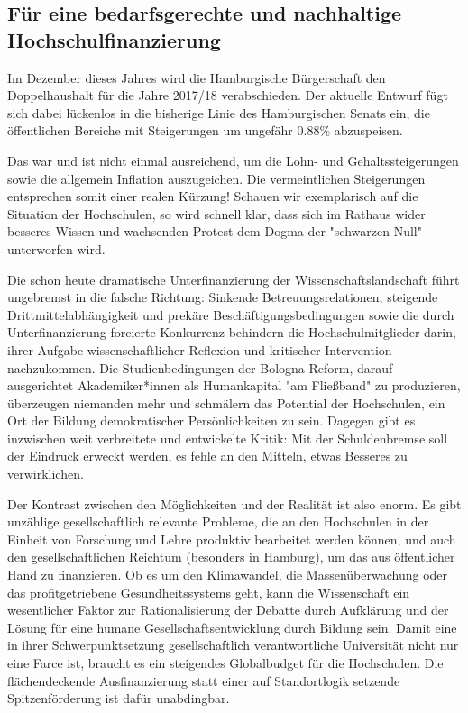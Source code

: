\documentclass[ngerman,headheight=70pt]{scrartcl}
\begin{document}
    \newpage

    \subsection*{Für eine bedarfsgerechte und nachhaltige Hochschulfinanzierung}

    Im Dezember dieses Jahres wird die Hamburgische Bürgerschaft den
    Doppelhaushalt für die Jahre 2017/18 verabschieden. Der aktuelle Entwurf
    fügt sich dabei lückenlos in die bisherige Linie des Hamburgischen Senats
    ein, die öffentlichen Bereiche mit Steigerungen um ungefähr 0.88\% abzuspeisen.

    Das war und ist nicht einmal ausreichend, um die Lohn- und Gehaltssteigerungen
    sowie die allgemein Inflation auszugeichen. Die vermeintlichen Steigerungen
    entsprechen somit einer realen Kürzung! Schauen wir exemplarisch auf die
    Situation der Hochschulen, so wird schnell klar, dass sich im Rathaus wider
    besseres Wissen und wachsenden Protest dem Dogma der "schwarzen Null"
    unterworfen wird.

    Die schon heute dramatische Unterfinanzierung der Wissenschaftslandschaft
    führt ungebremst in die falsche Richtung: Sinkende Betreuungsrelationen,
    steigende Drittmittelabhängigkeit und prekäre Beschäftigungsbedingungen sowie
    die durch Unterfinanzierung forcierte Konkurrenz behindern die
    Hochschulmitglieder darin, ihrer Aufgabe wissenschaftlicher Reflexion und
    kritischer Intervention nachzukommen. Die Studienbedingungen der Bologna-Reform,
    darauf ausgerichtet Akademiker*innen als Humankapital "am Fließband" zu
    produzieren, überzeugen niemanden mehr und schmälern das Potential der
    Hochschulen, ein Ort der Bildung demokratischer Persönlichkeiten zu sein.
    Dagegen gibt es inzwischen weit verbreitete und entwickelte Kritik: Mit der
    Schuldenbremse soll der Eindruck erweckt werden, es fehle an den Mitteln,
    etwas Besseres zu verwirklichen.

    Der Kontrast zwischen den Möglichkeiten und der Realität ist also enorm. Es
    gibt unzählige gesellschaftlich relevante Probleme, die an den Hochschulen
    in der Einheit von Forschung und Lehre produktiv bearbeitet werden können,
    und auch den gesellschaftlichen Reichtum (besonders in Hamburg), um das aus
    öffentlicher Hand zu finanzieren. Ob es um den Klimawandel, die
    Massenüberwachung oder das profitgetriebene Gesundheitssystems geht, kann die
    Wissenschaft ein wesentlicher Faktor zur Rationalisierung der Debatte durch
    Aufklärung und der Lösung für eine humane Gesellschaftsentwicklung durch
    Bildung sein. Damit eine in ihrer Schwerpunktsetzung gesellschaftlich
    verantwortliche Universität nicht nur eine Farce ist, braucht es ein steigendes
    Globalbudget für die Hochschulen. Die flächendeckende Ausfinanzierung statt
    einer auf Standortlogik setzende Spitzenförderung ist dafür unabdingbar.
\end{document}
